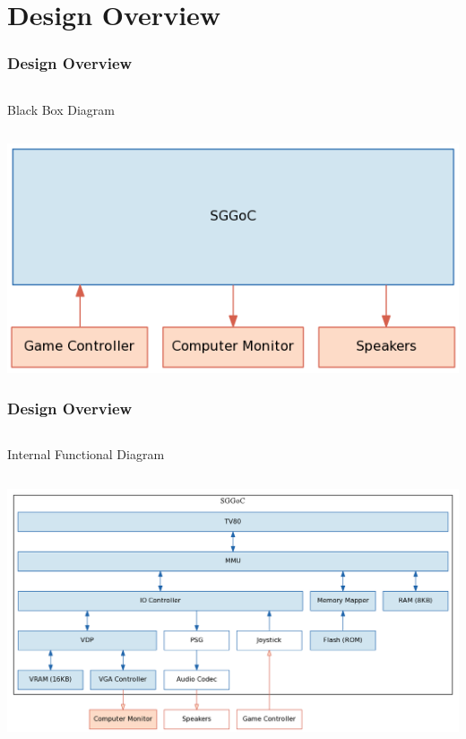 \documentclass{beamer}
\begin{document}
\section{Design Overview}
\begin{frame}
    \frametitle{Design Overview}
    \begin{columns}[c]
        Black Box Diagram
    \end{columns}
    \begin{center}
        \includegraphics[scale=0.4]{../block_diagrams/block_diagram_external.png}
    \end{center}
\end{frame}

\begin{frame}
    \frametitle{Design Overview}
    \begin{columns}[c]
        \vspace{-0.8cm}
        Internal Functional Diagram
    \end{columns}
    \begin{center}
        \includegraphics[scale=0.3]{../block_diagrams/block_diagram_internal_implemented.png}
    \end{center}
\end{frame}
\end{document}
